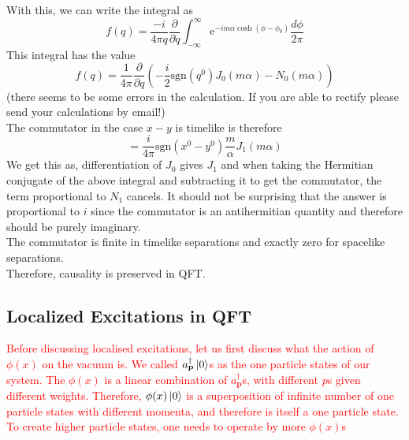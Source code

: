\documentclass[11pt, notitlepage]{report}
\newcommand{\del}{\partial}
\newcommand{\e}{\mathrm{e}}
\newcommand{\adag}[1]{a^\dagger_\mathbf{#1}}
\numberwithin{equation}{section}
\begin{document}
    With this, we can write the integral as 
    \begin{equation*}
        f(q) = \frac{-i}{4\pi q} \frac{\del}{\del q} \int_{-\infty}^\infty \e^{-im\alpha \cosh(\phi -\phi_0)} \frac{d\phi}{2\pi} 
    \end{equation*}
    This integral has the value 
    \begin{equation*}
        f(q) = \frac{1}{4\pi} \frac{\del}{\del q} \left(-\frac{i}{2} \mathrm{sgn}(q^0) J_0(m\alpha) - N_0(m\alpha)\right)
    \end{equation*}
    (there seems to be some errors in the calculation. If you are able to rectify please send your calculations by email!)\\
    The commutator in the case \(x-y\) is timelike is therefore 
    \begin{equation*}
        [\phi(x), \phi(y)] = \frac{i}{4\pi} \mathrm{sgn}(x^0 - y^0) \frac{m}{\alpha} J_1(m\alpha)
    \end{equation*}
    We get this as, differentiation of \(J_0\) gives \(J_1\) and when taking the Hermitian conjugate of the above integral and subtracting it to get the commutator, the term proportional to \(N_1\) cancels. It should not be surprising that the answer is proportional to \(i\) since the commutator is an antihermitian quantity and therefore should be purely imaginary. \\

    The commutator is finite in timelike separations and exactly zero for spacelike separations. \\
    Therefore, causality is preserved in QFT.
    
    \subsection{Localized Excitations in QFT}
    \textcolor{red}{Before discussing localised excitations, let us first discuss what the action of \(\phi(x)\) on the vacuum is. We called \(\adag{p}\ket{0}\)s as the one particle states of our system. The \(\phi(x)\) is a linear combination of \(\adag{p}\)s, with different \(p\)s given different weights. Therefore, \(\phi(x)\ket{0}\) is a superposition of infinite number of one particle states with different momenta, and therefore is itself a one particle state. To create higher particle states, one needs to operate by more \(\phi(x)\)s \\}
\end{document}
